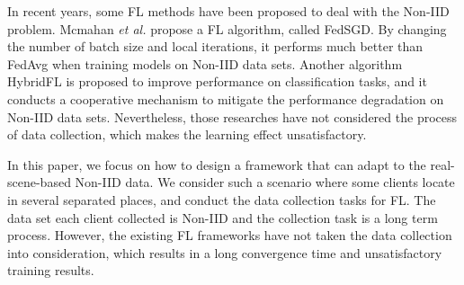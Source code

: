 \documentclass[conference]{IEEEtran}
\begin{document}

In recent years, some FL methods have been proposed 
to deal with the Non-IID problem. Mcmahan \textit{et al.}
propose a FL algorithm, called FedSGD\cite{mcmahan2017communication}. By changing 
the number of batch size and local iterations, 
it performs much better than FedAvg when training 
models on Non-IID data sets\cite{yoshida2020hybrid}. Another algorithm HybridFL 
is proposed to improve performance on classification 
tasks, and it conducts a cooperative mechanism to 
mitigate the performance degradation on Non-IID data
 sets. Nevertheless, those researches have not considered 
 the process of data collection, which makes the learning 
 effect unsatisfactory. 


In this paper, we focus on how to design a framework that can adapt
to the real-scene-based Non-IID data. We consider such a scenario where some clients
locate in several separated places, and conduct the data collection tasks for FL. The data set each client 
collected is Non-IID and the collection task is a long term process.  
However, the existing FL frameworks have not 
taken the data collection into consideration, which results in 
a long convergence time and unsatisfactory training results.
\end{document}
